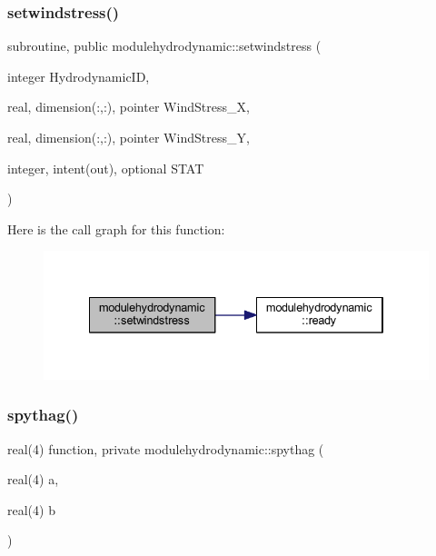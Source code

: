 \subsubsection{\texorpdfstring{setwindstress()}{setwindstress()}}
{\footnotesize\ttfamily subroutine, public modulehydrodynamic\+::setwindstress (\begin{DoxyParamCaption}\item[{integer}]{Hydrodynamic\+ID,  }\item[{real, dimension(\+:,\+:), pointer}]{Wind\+Stress\+\_\+X,  }\item[{real, dimension(\+:,\+:), pointer}]{Wind\+Stress\+\_\+Y,  }\item[{integer, intent(out), optional}]{S\+T\+AT }\end{DoxyParamCaption})}

Here is the call graph for this function\+:\nopagebreak
\begin{figure}[H]
\begin{center}
\leavevmode
\includegraphics[width=334pt]{namespacemodulehydrodynamic_a9286159a46a146fe7713e10cda0bf636_cgraph}
\end{center}
\end{figure}
\mbox{\label{namespacemodulehydrodynamic_ad663f2d92092122d354c40c8e3be00b0}} 
\subsubsection{\texorpdfstring{spythag()}{spythag()}}
{\footnotesize\ttfamily real(4) function, private modulehydrodynamic\+::spythag (\begin{DoxyParamCaption}\item[{real(4)}]{a,  }\item[{real(4)}]{b }\end{DoxyParamCaption})\hspace{0.3cm}{\ttfamily [private]}}

